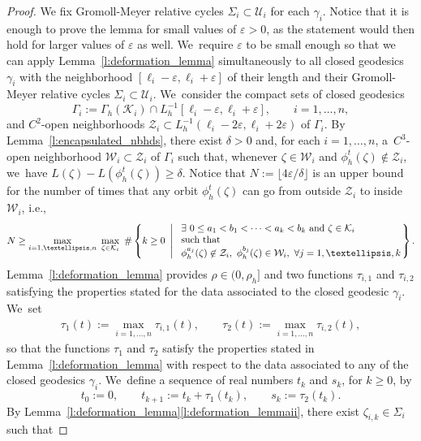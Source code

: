 \documentclass[11pt]{article}
\newcommand{\ie}{i.e.,\xspace}
\let\epsilon\varepsilon
\newcommand{\KK}{\mathcal{K}}
\newcommand{\UU}{\mathcal{U}}
\newcommand{\WW}{\mathcal{W}}
\newcommand{\ZZ}{\mathcal{Z}}
\theoremstyle{plain}
\theoremstyle{definition}
\begin{document}
\begin{proof}
We fix Gromoll-Meyer relative cycles $\Sigma_i\subset\UU_i$ for each $\gamma_i$.
Notice that it is enough to prove the lemma for small values of $\epsilon>0$, as the statement would then hold for larger values of $\epsilon$ as well. We~require $\epsilon$ to be small enough so that we can apply Lemma~\ref{l:deformation_lemma} simultaneously to all closed geodesics $\gamma_i$ with the neighborhood \hbox{$[\ell_i-\epsilon,\ell_i+\epsilon]$} of their length and their Gromoll-Meyer relative cycles $\Sigma_i\subset\UU_i$. We~consider the compact sets of closed geodesics
\[
\Gamma_i:=\Gamma_h(\KK_i)\cap L_h^{-1}[\ell_i-\epsilon,\ell_i+\epsilon],\qquad i=1,\dots,n,
\]
and $C^2$-open neighborhoods $\ZZ_i\subset L_h^{-1}(\ell_i-2\epsilon,\ell_i+2\epsilon)$ of $\Gamma_i$.
By Lemma~\ref{l:encapsulated_nbhds}, there exist $\delta>0$ and, for each $i=1,\dots,n$, a~$C^3$-open neighborhood $\WW_i\subset\ZZ_i$ of $\Gamma_i$ such that, whenever $\zeta\in\WW_i$ and $\phi_h^t(\zeta)\not\in\ZZ_i$, we~have $L(\zeta)-L(\phi_h^t(\zeta))\geq\delta$. Notice that $N:=\lfloor 4\epsilon/\delta \rfloor$ is an upper bound for the number of times that any orbit $\phi_h^t(\zeta)$ can go from outside $\ZZ_i$ to inside $\WW_i$, \ie
\begin{align*}
N
\geq
\max_{i=1,\dots,n}\
\max_{\zeta\in\KK_i}\ \#\left\{k\geq0\ \left|\
\begin{array}{l@{}}
\exists\ 0\leq a_1< b_1< \cdots< a_k< b_k\mbox{ and } \zeta\in\KK_i\\
\mbox{such that}\\
\phi_h^{a_j}(\zeta)\not\in\ZZ_i,\ \phi_h^{b_j}(\zeta)\in\WW_i,\ \forall j=1,\dots,k
\end{array}
\right.\right\}.
\end{align*}
Lemma~\ref{l:deformation_lemma} provides $\rho\in(0,\rho_h]$ and two functions $\tau_{i,1}$ and $\tau_{i,2}$ satisfying the properties stated for the data associated to the closed geodesic $\gamma_i$. We~set
\begin{align*}
\tau_1(t):=\max_{i=1,\dots,n} \tau_{i,1}(t),\qquad
\tau_2(t):=\max_{i=1,\dots,n} \tau_{i,2}(t),
\end{align*}
so that the functions $\tau_1$ and $\tau_2$ satisfy the properties stated in Lemma~\ref{l:deformation_lemma} with respect to the data associated to any of the closed geodesics $\gamma_i$. We~define a sequence of real numbers $t_k$ and $s_k$, for $k\geq0$, by
\[
t_0:=0,
\qquad
t_{k+1}:=t_k+\tau_1(t_k),
\qquad
s_k:=\tau_2(t_k).
\]
By Lemma~\ref{l:deformation_lemma}\eqref{l:deformation_lemmaii}, there exist $\zeta_{i,k}\in\Sigma_i$ such that

\end{proof}
\end{document}
